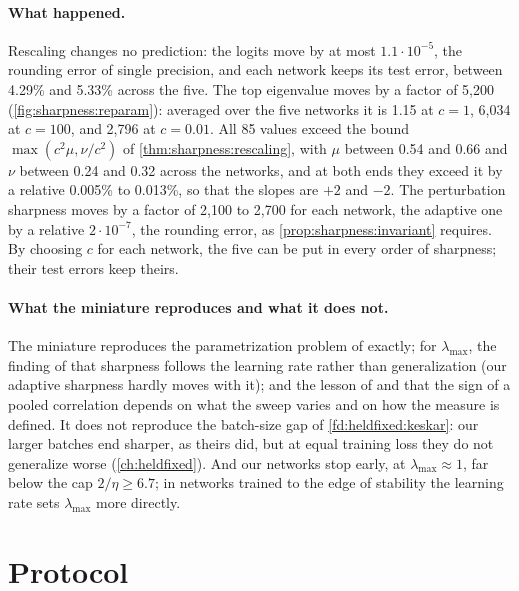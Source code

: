 \begin{refsection}
\paragraph{What happened.} Rescaling changes no prediction: the logits move by at most $1.1\cdot10^{-5}$, the rounding error of single precision, and each network keeps its test error, between 4.29\% and 5.33\% across the five. The top eigenvalue moves by a factor of 5,200 (\cref{fig:sharpness:reparam}): averaged over the five networks it is 1.15 at $c=1$, 6,034 at $c=100$, and 2,796 at $c=0.01$. All 85 values exceed the bound $\max(c^2\mu,\nu/c^2)$ of \cref{thm:sharpness:rescaling}, with $\mu$ between 0.54 and 0.66 and $\nu$ between 0.24 and 0.32 across the networks, and at both ends they exceed it by a relative 0.005\% to 0.013\%, so that the slopes are $+2$ and $-2$. The perturbation sharpness moves by a factor of 2,100 to 2,700 for each network, the adaptive one by a relative $2\cdot10^{-7}$, the rounding error, as \cref{prop:sharpness:invariant} requires. By choosing $c$ for each network, the five can be put in every order of sharpness; their test errors keep theirs.

\paragraph{What the miniature reproduces and what it does not.} The miniature reproduces the parametrization problem of \textcite{DinhEtAl2017} exactly; for $\lambda_{\max}$, the finding of \textcite{AndriushchenkoEtAl2023} that sharpness follows the learning rate rather than generalization (our adaptive sharpness hardly moves with it); and the lesson of \textcite{JiangEtAl2020} and \textcite{DziugaiteEtAl2020} that the sign of a pooled correlation depends on what the sweep varies and on how the measure is defined. It does not reproduce the batch-size gap of \cref{fd:heldfixed:keskar}: our larger batches end sharper, as theirs did, but at equal training loss they do not generalize worse (\cref{ch:heldfixed}). And our networks stop early, at $\lambda_{\max}\approx1$, far below the cap $2/\eta\ge6.7$; in networks trained to the edge of stability the learning rate sets $\lambda_{\max}$ more directly.

\section{Protocol}\label{sec:sharpness:protocol}


\end{refsection}
